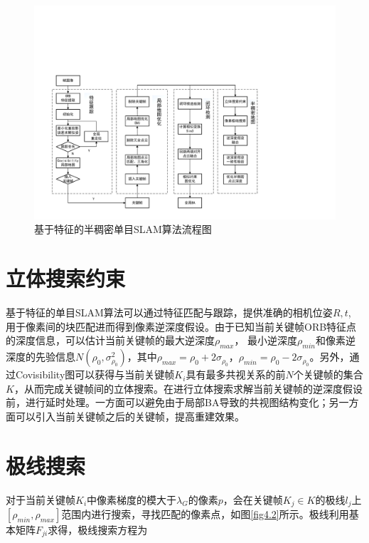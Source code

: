 \begin{figure}[h]
\centering
\includegraphics[scale=0.4,angle=-90]{figures/Fig4-1.pdf}
\caption{基于特征的半稠密单目SLAM算法流程图}
\label{fig4.1}
\end{figure}





\section{立体搜索约束}
基于特征的单目SLAM算法可以通过特征匹配与跟踪，提供准确的相机位姿$R,t$, 用于像素间的块匹配进而得到像素逆深度假设。由于已知当前关键帧ORB特征点的深度信息，可以估计当前关键帧的最大逆深度$\rho_{max}$， 最小逆深度$\rho_{min}$和像素逆深度的先验信息$N\left( \rho_0,\sigma_{\rho_0}^2  \right)$，其中$\rho_{max}=\rho_0+2\sigma_{\rho_0}$，$\rho_{min}=\rho_0-2\sigma_{\rho_0}$。另外，通过Covisibility图可以获得与当前关键帧$K_i$具有最多共视关系的前$N$个关键帧的集合$K$，从而完成关键帧间的立体搜索。在进行立体搜索求解当前关键帧的逆深度假设前，进行延时处理。一方面可以避免由于局部BA导致的共视图结构变化；另一方面可以引入当前关键帧之后的关键帧，提高重建效果。


\section{极线搜索}
对于当前关键帧$K_i$中像素梯度的模大于$\lambda_G$的像素$p$，会在关键帧$K_j \in K$的极线$l_j$上$\left[ \rho_{min}, \rho_{max} \right]$范围内进行搜索，寻找匹配的像素点，如图\ref{fig4.2}所示。极线利用基本矩阵$F_{ji}$求得，极线搜索方程为

